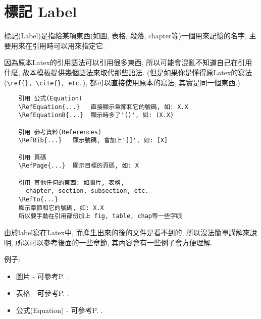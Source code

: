 \newpage
\section{標記 Label}
標記(Label)是指給某項東西(如圖, 表格, 段落, chapter等)一個用來記憶的名字, 主要用來在引用時可以用來指定它.

因為原本Latex的引用語法可以引用很多東西, 所以可能會混亂不知道自己在引用什麼, 故本模板提供幾個語法來取代那些語法. (但是如果你是懂得原Latex的寫法(\verb|\ref{}, \cite{}, etc.|), 都可以直接使用原本的寫法, 其實是同一個東西.)

  \begin{framed}
  \begin{verbatim}
    引用 公式(Equation)
    \RefEquation{...}   直接顯示章節和它的號碼, 如: X.X
    \RefEquationB{...}  顯示時多了'()', 如: (X.X)

    引用 參考資料(References)
    \RefBib{...}   顯示號碼, 會加上'[]', 如: [X]

    引用 頁碼
    \RefPage{...}  顯示目標的頁碼, 如: X

    引用 其他任何的東西: 如圖片, 表格,
      chapter, section, subsection, etc.
    \RefTo{...}
    顯示章節和它的號碼, 如: X.X
    所以要手動在引用部份加上 fig, table, chap等一些字眼
  \end{verbatim}
  \end{framed}

由於label寫在Latex中, 而產生出來的後的文件是看不到的, 所以沒法簡單講解來說明, 所以可以參考後面的一些章節, 其內容會有一些例子會方便理解.

例子:
\begin{itemize}
  \item 圖片 - 可參考P. .

  \item 表格 - 可參考P. .

  \item 公式(Equation) - 可參考P. .
\end{itemize}

